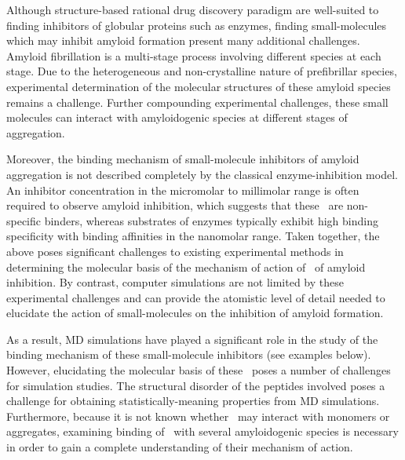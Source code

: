 
Although structure-based rational drug discovery paradigm are well-suited to finding inhibitors of globular proteins such as enzymes, finding small-molecules which may inhibit amyloid formation present many additional challenges. Amyloid fibrillation is a multi-stage process involving different species at each stage.  Due to the heterogeneous and non-crystalline nature of prefibrillar species, experimental determination of the molecular structures of these amyloid species remains a challenge.  Further compounding experimental challenges, these small molecules can interact with amyloidogenic species at different stages of aggregation. 

Moreover, the binding mechanism of small-molecule inhibitors of amyloid aggregation is not described completely by the classical enzyme-inhibition model.   An inhibitor concentration in the micromolar to millimolar range is often required to observe amyloid inhibition, which suggests that these \smis\ are non-specific binders, whereas substrates of enzymes typically exhibit high binding specificity with binding affinities in the nanomolar range.  Taken together, the above poses significant challenges to existing experimental methods in determining the molecular basis of the mechanism of action of \smis\ of amyloid inhibition.  By contrast, computer simulations are not limited by these experimental challenges and can provide the atomistic level of detail needed to elucidate the action of small-molecules on the inhibition of amyloid formation.

As a result, MD simulations have played a significant role in the study of the binding mechanism of these small-molecule inhibitors (see examples below). However, elucidating the molecular basis of these \smis\ poses a number of challenges for simulation studies. The structural disorder of the peptides involved poses a challenge for obtaining statistically-meaning properties from MD simulations.  Furthermore, because it is not known whether \smis\ may interact with monomers or aggregates, examining binding of \smi\ with several amyloidogenic species is necessary in order to gain a complete understanding of their mechanism of action.

